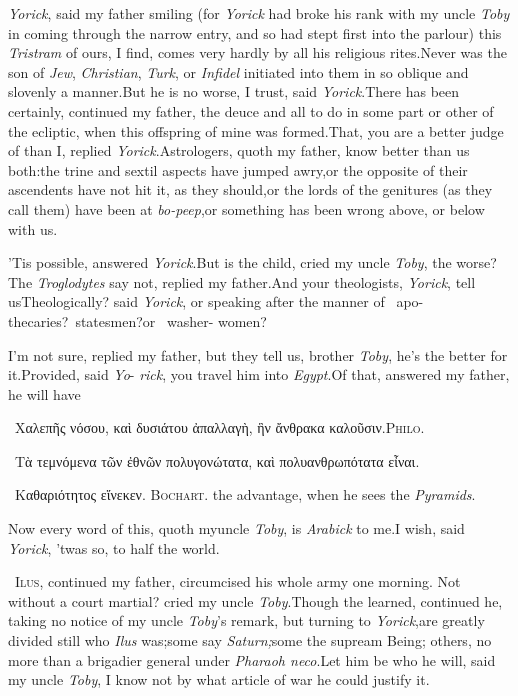 \documentclass{article}
\begin{document}
 \textit{Yorick}, said my father smiling (for
\textit{Yorick} had broke his rank with my uncle \textit{Toby} in coming
through the narrow entry, and so had stept first into the parlour)\tsk
this \textit{Tristram} of ours, I find, comes very hardly by all his
religious rites.\tsk Never was the son of \textit{Jew},
\textit{Christian}, \textit{Turk}, or \textit{Infidel} initiated into
them in so oblique and slovenly a manner.\tsk But he is no worse, I
trust, said \textit{Yorick}.\tsk There has been certainly, continued my
father, the deuce and all to do in some part or other of the ecliptic,
when this offspring of mine was formed.\break\tsk That, you are a better
judge of than I, replied \textit{Yorick}.\tsk Astrologers, quoth my
father, know better than us both:\tsk the trine and sextil aspects have
jumped awry,\tsk or the opposite of their ascendents have not hit it, as
they should,\tsk or the lords of the genitures (as they call them)
have been at \textit{bo-peep},\tsk or something has been wrong above, or
below with us.

’Tis possible, answered \textit{Yorick}.\tsk But is the child, cried my
uncle \textit{Toby}, the worse?\tsk The \textit{Troglodytes} say not, replied my
father.\tsk And your theologists, \textit{Yo\-rick}, tell us\tsk Theologically? said
\textit{Yorick},\break
\tsk or speaking after the manner of \fnast\ apo-\break
thecaries?\tsk \dagger\ statesmen?\tsk or \ddagger\ washer-\break
women?

\enlargethispage\baselineskip

\tsh  I’m not sure, replied my father,\break
\tsk but they tell us, brother \textit{Toby}, he’s\break
the better for it.\tsh Provided, said \textit{Yo}-\break
\textit{rick}, you travel him into \textit{Egypt}.\tsk Of\break
that, answered my father, he will have\break

\bgroup\footnotesize
\indent\fnast\ Χαλεπῆς νόσου, καὶ δυσιάτου ἀπαλλαγὴ, ἣν ἄνθρακα
καλοῦσιν.\hfill\textsc{Philo}.

\indent\dagger\ Τὰ τεμνόμενα τῶν ἐθνῶν πολυγονώτατα, καὶ πολυανθρωπότατα εἶναι.

\indent\ddagger\ Καθαριότητος εἵνεκεν. \hfill \textsc{Bochart}. 
\egroup
{}
\newpage\noindent
the advantage, when he sees the \textit{Pyramids}.\tsh

Now every word of this, quoth my\break uncle \textit{Toby}, is
\textit{Arabick} to me.\tsh I wish, said \textit{Yorick},
’twas so, to half the world.

\tsk\fnast\ \textsc{Ilus}, continued my father,
circumcised his whole army one morning.\break
\tsk Not without a court martial? cried my uncle \textit{Toby}.\tsh Though the learned, continued he,
taking no notice of my uncle \textit{Toby}’s remark, but turning to
\textit{Yo\-rick},\tsk are greatly divided still who \textit{Ilus}
was;\tsk some say \textit{Saturn;}\tsk some the supream Being;\tsk
others, no more than a brigadier general under
\textit{Pharaoh neco}.\break\tsh Let him be who he will, said my uncle
\textit{Toby}, I know not by what article of war he could justify it.
\end{document}

